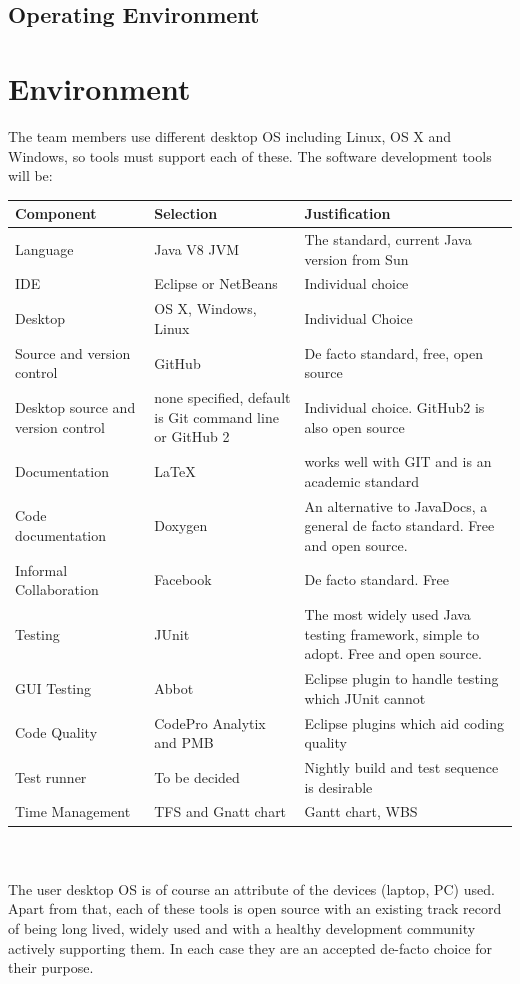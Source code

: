 \documentclass[a4paper,10pt]{article}
\begin{document}
\subsection{Operating Environment}


\section{Environment}


The team members use different desktop OS including Linux, OS X and Windows, so tools must support each of these. The software development tools will be:    \\

\setlength\extrarowheight{5pt}
\begin{tabular}{ || p{35mm}|p{40mm}|p{85mm} ||}

\hline
\textbf{Component} & \textbf{Selection} & \textbf{Justification} \\
\hline

 Language & Java V8 JVM &  The standard, current Java version from Sun  \\
IDE & Eclipse or NetBeans & Individual choice\\
Desktop & OS X, Windows, Linux & Individual Choice\\
Source and version control & GitHub & De facto standard, free, open source\\
Desktop source and version control & none specified, default is Git command line or GitHub 2 & Individual choice. GitHub2 is also open source\\
Documentation & LaTeX & works well with GIT and is an academic standard\\
Code documentation  &  Doxygen & An alternative to JavaDocs, a general de facto standard. Free and open source.  \\
Informal Collaboration & Facebook & De facto standard. Free\\
Testing & JUnit & The most widely used Java testing framework, simple to adopt. Free and open source. \\
GUI Testing & Abbot & Eclipse plugin to handle testing which JUnit cannot\\
Code Quality & CodePro Analytix and PMB & Eclipse plugins which aid coding quality\\
Test runner & To be decided & Nightly build and test sequence is desirable\\
Time Management & TFS and Gnatt chart & Gantt chart, WBS\\
 \hline
\end{tabular}
\\
\\
The user desktop OS is of course an attribute of the devices (laptop, PC) used. Apart from that, each of these tools is open source with an existing track record of being long lived, widely used and with a healthy development community actively supporting them. In each case they are an accepted de-facto choice for their purpose.
\end{document}
